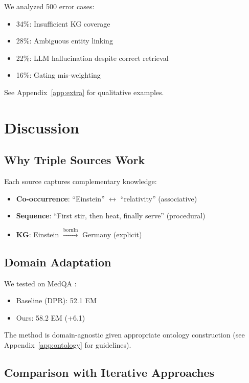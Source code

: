 \documentclass[10pt,twocolumn]{article}
\begin{document}
We analyzed 500 error cases:
\begin{itemize}
    \item 34\%: Insufficient KG coverage
    \item 28\%: Ambiguous entity linking
    \item 22\%: LLM hallucination despite correct retrieval
    \item 16\%: Gating mis-weighting
\end{itemize}

See Appendix~\ref{app:extra} for qualitative examples.

\section{Discussion}

\subsection{Why Triple Sources Work}

Each source captures complementary knowledge:
\begin{itemize}
    \item \textbf{Co-occurrence}: ``Einstein'' $\leftrightarrow$ ``relativity'' (associative)
    \item \textbf{Sequence}: ``First stir, then heat, finally serve'' (procedural)
    \item \textbf{KG}: Einstein $\xrightarrow{\text{bornIn}}$ Germany (explicit)
\end{itemize}

\subsection{Domain Adaptation}

We tested on MedQA \cite{jin2021medqa}:
\begin{itemize}
    \item Baseline (DPR): 52.1 EM
    \item Ours: 58.2 EM (+6.1)
\end{itemize}

The method is domain-agnostic given appropriate ontology construction (see Appendix~\ref{app:ontology} for guidelines).

\subsection{Comparison with Iterative Approaches}
\end{document}
